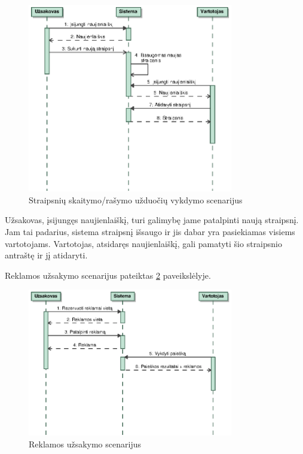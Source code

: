 \documentclass[12pt]{article}
\begin{document}
	\begin{figure}[h]
		\begin{center}
			\includegraphics[width=0.8\textwidth]{Straipsniai.eps}
			\caption{Straipsnių skaitymo/rašymo užduočių vykdymo scenarijus\label{ArticleScenario}}
		\end{center}
	\end{figure}
	
	Užsakovas, įsijungęs naujienlaiškį, turi galimybę jame patalpinti naują straipsnį. Jam tai padarius, sistema straipsnį išsaugo ir jis dabar yra pasiekiamas visiems vartotojams. Vartotojas, atsidaręs naujienlaiškį, gali pamatyti šio straipsnio antraštę ir jį atidaryti.
	\pagebreak
	
	Reklamos užsakymo scenarijus pateiktas \ref{AdBuyScenario} paveikslėlyje.
	
	\begin{figure}[h]
		\begin{center}
			\includegraphics[width=0.8\textwidth]{ReklamosSeka.eps}
			\caption{Reklamos užsakymo scenarijus\label{AdBuyScenario}}
		\end{center}
	\end{figure}
	
\end{document}
